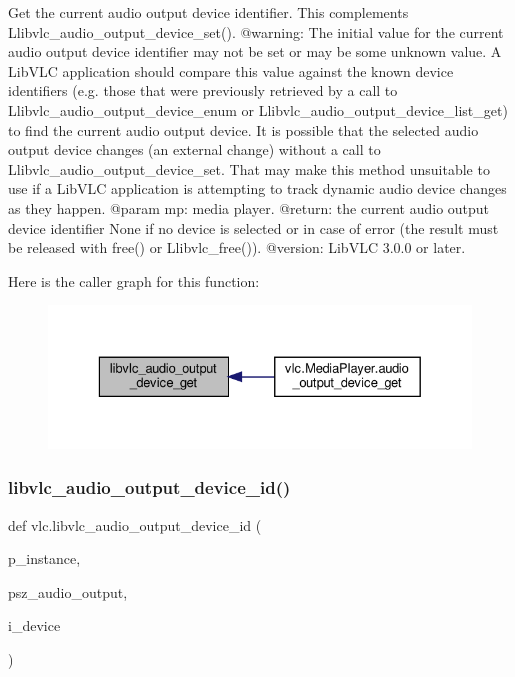 \begin{DoxyVerb}Get the current audio output device identifier.
This complements L{libvlc_audio_output_device_set}().
@warning: The initial value for the current audio output device identifier
may not be set or may be some unknown value. A LibVLC application should
compare this value against the known device identifiers (e.g. those that
were previously retrieved by a call to L{libvlc_audio_output_device_enum} or
L{libvlc_audio_output_device_list_get}) to find the current audio output device.
It is possible that the selected audio output device changes (an external
change) without a call to L{libvlc_audio_output_device_set}. That may make this
method unsuitable to use if a LibVLC application is attempting to track
dynamic audio device changes as they happen.
@param mp: media player.
@return: the current audio output device identifier None if no device is selected or in case of error (the result must be released with free() or L{libvlc_free}()).
@version: LibVLC 3.0.0 or later.
\end{DoxyVerb}
 Here is the caller graph for this function\+:
\nopagebreak
\begin{figure}[H]
\begin{center}
\leavevmode
\includegraphics[width=329pt]{namespacevlc_a5b5babcb373f2af5cfa81ff75f932192_icgraph}
\end{center}
\end{figure}
\mbox{\label{namespacevlc_a058a41cbf5946ba44fdb114876c47d81}} 
\subsubsection{\texorpdfstring{libvlc\+\_\+audio\+\_\+output\+\_\+device\+\_\+id()}{libvlc\_audio\_output\_device\_id()}}
{\footnotesize\ttfamily def vlc.\+libvlc\+\_\+audio\+\_\+output\+\_\+device\+\_\+id (\begin{DoxyParamCaption}\item[{}]{p\+\_\+instance,  }\item[{}]{psz\+\_\+audio\+\_\+output,  }\item[{}]{i\+\_\+device }\end{DoxyParamCaption})}


